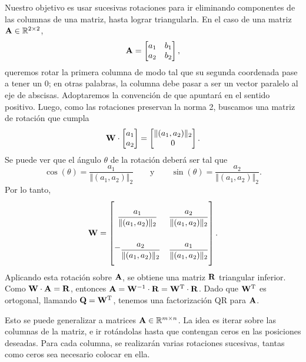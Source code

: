 Nuestro objetivo es usar sucesivas rotaciones para ir eliminando componentes
de las columnas de una matriz, hasta lograr triangularla. En el caso de una
matriz
$\mathbf{A} \in \mathbb{R}^{2 \times 2}$,
\[
\mathbf{A} = \begin{bmatrix}
    a_{1} & b_{1} \\
    a_{2} & b_{2}
\end{bmatrix},
\]
queremos rotar la primera columna de modo tal que su segunda coordenada
pase a tener un $0$; en otras palabras, la columna debe pasar a ser un vector
paralelo al eje de abscisas. Adoptaremos la convención de que apuntará
en el sentido positivo. Luego, como las rotaciones preservan la norma 2,
buscamos una matriz de rotación que cumpla
\[
\mathbf{W} \cdot \begin{bmatrix} a_{1} \\ a_{2} \end{bmatrix} =
    \begin{bmatrix} \Vert (a_{1}, a_{2}) \Vert_2 \\ 0 \end{bmatrix}.
\]
Se puede ver que el ángulo $\theta$ de la rotación deberá ser tal que
\[ \cos(\theta) = \frac{a_1}{\Vert (a_{1}, a_{2}) \Vert_2}
    \qquad \text{y} \qquad
    \sin(\theta) = \frac{a_2}{\Vert (a_{1}, a_{2}) \Vert_2}. \]
Por lo tanto,
\[
\mat{W} = \begin{bmatrix}
    \vvecbox{.7cm}{\dfrac{a_1}{\Vert (a_{1}, a_{2}) \Vert_2}}
        & \vvecbox{.7cm}{\dfrac{a_2}{\Vert (a_{1}, a_{2}) \Vert_2}} \\
    - \vvecbox{.7cm}{\dfrac{a_2}{\Vert (a_{1}, a_{2}) \Vert_2}}
        & \vvecbox{.7cm}{\dfrac{a_1}{\Vert (a_{1}, a_{2}) \Vert_2}}
\end{bmatrix}.
\]
Aplicando esta rotación sobre $\mathbf{A}$, se obtiene una matriz $\mathbf{R}$
triangular inferior. Como $\mathbf{W} \cdot \mathbf{A} = \mathbf{R}$, entonces
$\mathbf{A} = \mathbf{W}^{-1} \cdot \mathbf{R} = \mathbf{W}^{\mathrm{T}} \cdot \mathbf{R}$. Dado
que $\mathbf{W}^{\mathrm{T}}$ es ortogonal, llamando $\mathbf{Q} = \mathbf{W}^{\mathrm{T}}$,
tenemos una factorización QR para $\mathbf{A}$.

Esto se puede generalizar a matrices $\mathbf{A} \in \mathbb{R}^{m \times n}$. La
idea es iterar sobre las columnas de la matriz, e ir rotándolas hasta que
contengan ceros en las posiciones deseadas. Para cada columna, se realizarán
varias rotaciones sucesivas, tantas como ceros sea necesario colocar en ella.

